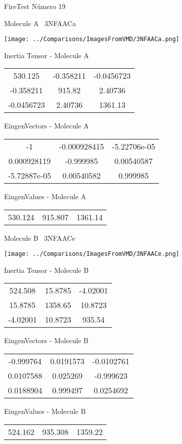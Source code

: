 \vtab[-3cm]
\begin{center}
{\large FireTest \tab Número 19}
\end{center}
\begin{multicols}{2}
\begin{center}

Molecule A \
3NFAACa

\texttt{[image: ../Comparisons/ImagesFromVMD/3NFAACa.png]}

Inertia Tensor - Molecule A \\
\begin{tabular}{|c c c|}
530.125	 & 	-0.358211	 & 	-0.0456723	 \\
-0.358211	 & 	915.82	 & 	2.40736	 \\
-0.0456723	 & 	2.40736	 & 	1361.13
\end{tabular}

\vtab
 EingenVectors - Molecule A     \\
\begin{tabular}{|c c c|}
-1	 & 	-0.000928415	 & 	-5.22706e-05	 \\
0.000928119	 & 	-0.999985	 & 	0.00540587	 \\
-5.72887e-05	 & 	0.00540582	 & 	0.999985
\end{tabular}

\vtab
 EingenValues - Molecule A     \\
\begin{tabular}{|c c c|}
530.124	 & 	915.807	 & 	1361.14	 \\
\end{tabular}
\columnbreak

Molecule B \
3NFAACe

\texttt{[image: ../Comparisons/ImagesFromVMD/3NFAACe.png]}

Inertia Tensor - Molecule B \\
\begin{tabular}{|c c c|}
524.508	 & 	15.8785	 & 	-4.02001	 \\
15.8785	 & 	1358.65	 & 	10.8723	 \\
-4.02001	 & 	10.8723	 & 	935.54
\end{tabular}

\vtab
 EingenVectors - Molecule B     \\
\begin{tabular}{|c c c|}
-0.999764	 & 	0.0191573	 & 	-0.0102761	 \\
0.0107588	 & 	0.025269	 & 	-0.999623	 \\
0.0188904	 & 	0.999497	 & 	0.0254692
\end{tabular}

\vtab
 EingenValues - Molecule B     \\
\begin{tabular}{|c c c|}
524.162	 & 	935.308	 & 	1359.22	 \\
\end{tabular}

\end{center}
\end{multicols}

